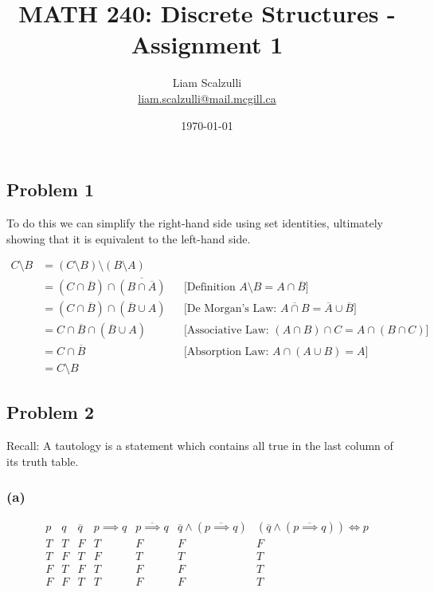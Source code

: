\documentclass[10pt]{article}
\title{MATH 240: Discrete Structures - Assignment 1}
\author{Liam Scalzulli\\
\href{mailto:liam.scalzulli@mail.mcgill.ca}{liam.scalzulli@mail.mcgill.ca}}
\date{\today}
\begin{document}
\maketitle

\subsection*{Problem 1}

To do this we can simplify the right-hand side using set identities,
ultimately showing that it is equivalent to the left-hand side.

\begin{align*}
  C \setminus B &= (C \setminus B) \setminus (B \setminus A) \\
    &= (C \cap \overline{B}) \cap \overline{(B \cap \overline{A})}
      && \text{[Definition } A \setminus B = A \cap \overline{B}] \\
    &= (C \cap \overline{B}) \cap (\overline{B} \cup A) && \text{[De Morgan's
      Law: } \overline{A \cap B} = \overline{A} \cup \overline{B}] \\
    &= C \cap \overline{B} \cap (\overline{B} \cup A) && \text{[Associative Law: }
      (A \cap B) \cap C = A \cap (B \cap C)]\\
    &= C \cap \overline{B} && \text{[Absorption Law: } A \cap (A \cup B) = A] \\
    &= C \setminus B
\end{align*}

\newpage
\subsection*{Problem 2}

Recall: A tautology is a statement which contains all true in the last column
of its truth table.

\subsubsection*{(a)}

\begin{displaymath}
  \begin{array}{c|c|c|c|c|c|c}
    p & q & \overline{q} & p \implies q & \overline{p \implies q} & \overline{q}
    \land (\overline{p \implies q}) & (\overline{q} \land (\overline{p \implies
    q})) \iff p \\
    \hline
    T & T & F & T & F & F & F \\
    T & F & T & F & T & T & T \\
    F & T & F & T & F & F & T \\
    F & F & T & T & F & F & T \\
  \end{array}
\end{displaymath}
\end{document}
